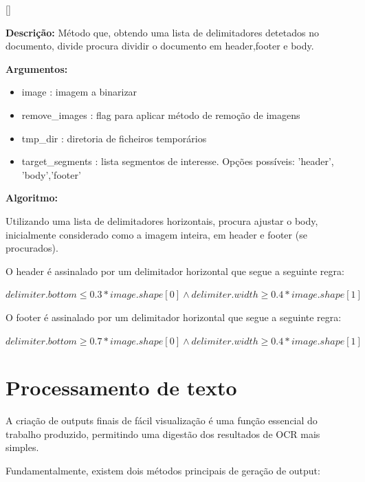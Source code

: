 [\normalsize]

\textbf{Descrição:} Método que, obtendo uma lista de delimitadores detetados no documento, divide procura dividir o documento em header,footer e body.


\textbf{Argumentos:}
\begin{itemize}\setlength\itemsep{-0.3em}
	\item image : imagem a binarizar
	\item remove\_images : flag para aplicar método de remoção de imagens
	\item tmp\_dir : diretoria de ficheiros temporários
	\item target\_segments : lista segmentos de interesse. Opções possíveis: 'header', 'body','footer'
\end{itemize}

\textbf{Algoritmo:} 

Utilizando uma lista de delimitadores horizontais, procura ajustar o body, inicialmente considerado como a imagem inteira, em header e footer (se procurados). 

O header é assinalado por um delimitador horizontal que segue a seguinte regra:

$delimiter.bottom \leq 0.3*image.shape[0] \wedge delimiter.width \geq 0.4*image.shape[1]$

O footer é assinalado por um delimitador horizontal que segue a seguinte regra:

$delimiter.bottom \geq 0.7*image.shape[0] \wedge delimiter.width \geq 0.4*image.shape[1]$





\section{Processamento de texto}
\label{contribution_text_processing}




A criação de outputs finais de fácil visualização é uma função essencial do trabalho produzido, permitindo uma digestão dos resultados de OCR mais simples.

Fundamentalmente, existem dois métodos principais de geração de output:

